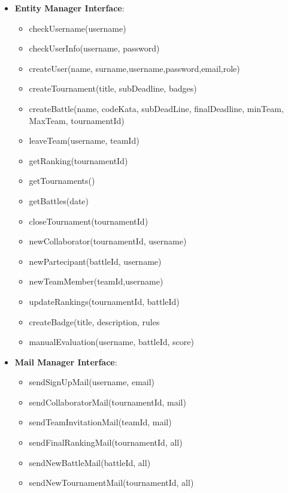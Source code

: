 \begin{itemize}
\begin{itemize}
        \end{itemize}
    \item\textbf{Entity Manager Interface}:
        \begin{itemize}
            \item checkUsername(username)
            \item checkUserInfo(username, password)
            \item createUser(name, surname,username,password,email,role)
            \item createTournament(title, subDeadline, badges)
            \item createBattle(name, codeKata, subDeadLine, finalDeadline, minTeam, MaxTeam, tournamentId)
            \item leaveTeam(username, teamId)
            \item getRanking(tournamentId)
            \item getTournaments()
            \item getBattles(date)
            \item closeTournament(tournamentId)
            \item newCollaborator(tournamentId, username)
            \item newPartecipant(battleId, username)
            \item newTeamMember(teamId,username)
            \item updateRankings(tournamentId, battleId)
            \item createBadge(title, description, rules
            \item manualEvaluation(username, battleId, score)
        \end{itemize}
    \item\textbf{Mail Manager Interface}:
        \begin{itemize}
            \item sendSignUpMail(username, email)
            \item sendCollaboratorMail(tournamentId, mail)
            \item sendTeamInvitationMail(teamId, mail)
            \item sendFinalRankingMail(tournamentId, all)
            \item sendNewBattleMail(battleId, all)
            \item sendNewTournamentMail(tournamentId, all)
        \end{itemize}        
\end{itemize}
\clearpage

